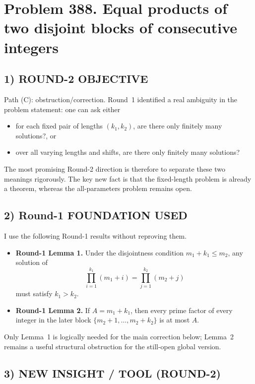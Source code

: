 \section*{Problem 388. Equal products of two disjoint blocks of consecutive integers}

\subsection*{1) ROUND-2 OBJECTIVE}

Path (C): obstruction/correction.  Round~1 identified a real ambiguity in the problem statement: one can ask either

\begin{itemize}
\item for each fixed pair of lengths $(k_1,k_2)$, are there only finitely many solutions?, or
\item over all varying lengths and shifts, are there only finitely many solutions?
\end{itemize}

The most promising Round-2 direction is therefore to separate these two meanings rigorously.  The key new fact is that the fixed-length problem is already a theorem, whereas the all-parameters problem remains open.

\subsection*{2) Round-1 FOUNDATION USED}

I use the following Round-1 results without reproving them.

\begin{itemize}
\item \textbf{Round-1 Lemma 1.}  Under the disjointness condition $m_1+k_1\le m_2$, any solution of
\[
\prod_{i=1}^{k_1}(m_1+i)=\prod_{j=1}^{k_2}(m_2+j)
\]
must satisfy $k_1>k_2$.

\item \textbf{Round-1 Lemma 2.}  If $A=m_1+k_1$, then every prime factor of every integer in the later block $\{m_2+1,\dots,m_2+k_2\}$ is at most $A$.
\end{itemize}

Only Lemma~1 is logically needed for the main correction below; Lemma~2 remains a useful structural obstruction for the still-open global version.

\subsection*{3) NEW INSIGHT / TOOL (ROUND-2)}

